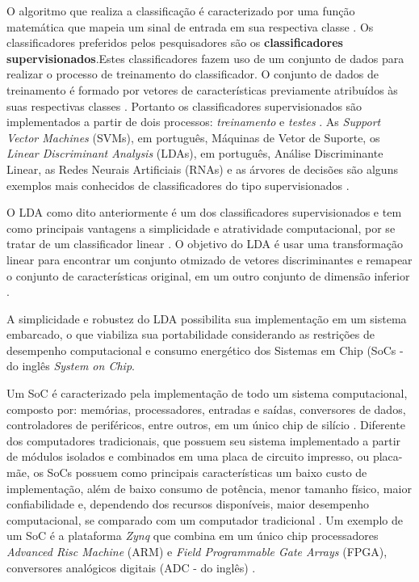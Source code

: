 O algoritmo que realiza a classificação é caracterizado por uma função matemática que mapeia um sinal de entrada em sua respectiva classe \cite{lottephd}. Os classificadores preferidos pelos pesquisadores são os \textbf{classificadores supervisionados}.Estes classificadores fazem uso de um conjunto de dados para realizar o processo de treinamento do classificador. O conjunto de dados de treinamento é formado por vetores de características previamente atribuídos às suas respectivas classes \cite{lottephd}. Portanto os classificadores supervisionados são implementados a partir de dois processos: \textit{treinamento} e \textit{testes} \cite{Siulybook}. As \textit{Support Vector Machines} (SVMs), em português, Máquinas de Vetor de Suporte, os \textit{Linear Discriminant Analysis} (LDAs), em português, Análise Discriminante Linear, as Redes Neurais Artificiais (RNAs) e as árvores de decisões são alguns exemplos mais conhecidos de classificadores do tipo supervisionados \cite{Siulybook}.

O LDA como dito anteriormente é um dos classificadores supervisionados e tem como principais vantagens a simplicidade e atratividade computacional, por se tratar de um classificador linear \cite{patternRecogn}. O objetivo do LDA é usar uma transformação linear para encontrar um conjunto otmizado de vetores
discriminantes e remapear o conjunto de características original, em um outro conjunto de dimensão  inferior \cite{ShashoaLDA}.

A simplicidade e robustez do LDA possibilita sua implementação em um sistema embarcado, o que viabiliza sua portabilidade considerando as restrições de desempenho computacional e consumo energético dos Sistemas em Chip (SoCs - do inglês \textit{System on Chip}.

Um SoC é caracterizado pela implementação de todo um sistema computacional, composto por: memórias, processadores, entradas e saídas, conversores de dados, controladores de periféricos, entre outros, em um único chip de silício \cite{zynqBook}. Diferente dos computadores tradicionais, que possuem seu sistema implementado a partir de módulos isolados e combinados em uma placa de circuito impresso, ou placa-mãe, os SoCs possuem como principais características um baixo custo de implementação, além de baixo consumo de potência, menor tamanho físico, maior confiabilidade e, dependendo dos recursos disponíveis, maior desempenho computacional, se comparado com um computador tradicional \cite{zynqBook}. Um exemplo de um SoC é a plataforma \textit{Zynq} que combina em um único chip processadores \textit{Advanced Risc Machine} (ARM) e \textit{Field Programmable Gate Arrays} (FPGA), conversores analógicos digitais (ADC - do inglês) \cite{zynqBook}. 

